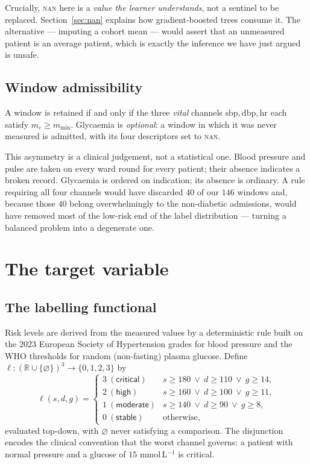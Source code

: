 \documentclass[11pt,a4paper]{article}
\newcommand{\R}{\mathbb{R}}
\newcommand{\sbp}{\mathrm{sbp}}
\newcommand{\dbp}{\mathrm{dbp}}
\newcommand{\hr}{\mathrm{hr}}
\begin{document}
Crucially, \textsc{nan} here is a \emph{value the learner understands}, not a
sentinel to be replaced. Section~\ref{sec:nan} explains how gradient-boosted trees
consume it. The alternative --- imputing a cohort mean --- would assert that an
unmeasured patient is an average patient, which is exactly the inference we have
just argued is unsafe.

\subsection{Window admissibility}

A window is retained if and only if the three \emph{vital} channels
$\sbp,\dbp,\hr$ each satisfy $m_c \ge m_{\min}$. Glycaemia is \emph{optional}: a
window in which it was never measured is admitted, with its four descriptors set
to \textsc{nan}.

This asymmetry is a clinical judgement, not a statistical one. Blood pressure and
pulse are taken on every ward round for every patient; their absence indicates a
broken record. Glycaemia is ordered on indication; its absence is ordinary. A rule
requiring all four channels would have discarded $40$ of our $146$ windows and,
because those $40$ belong overwhelmingly to the non-diabetic admissions, would have
removed most of the low-risk end of the label distribution --- turning a balanced
problem into a degenerate one.

\section{The target variable}
\label{sec:target}

\subsection{The labelling functional}

Risk levels are derived from the measured values by a deterministic rule built on
the 2023 European Society of Hypertension grades for blood pressure and the WHO
thresholds for random (non-fasting) plasma glucose. Define
$\ell : (\R\cup\{\varnothing\})^3 \to \{0,1,2,3\}$ by
\begin{equation}
\label{eq:label}
  \ell(s,d,g) =
  \begin{cases}
    3 \ (\textsf{critical}) & s\ge 180 \ \vee\ d\ge 110 \ \vee\ g\ge 14,\\
    2 \ (\textsf{high})     & s\ge 160 \ \vee\ d\ge 100 \ \vee\ g\ge 11,\\
    1 \ (\textsf{moderate}) & s\ge 140 \ \vee\ d\ge 90  \ \vee\ g\ge 8,\\
    0 \ (\textsf{stable})   & \text{otherwise,}
  \end{cases}
\end{equation}
evaluated top-down, with $\varnothing$ never satisfying a comparison. The
disjunction encodes the clinical convention that the worst channel governs: a
patient with normal pressure and a glucose of $15$ mmol\,L$^{-1}$ is critical.
\end{document}
